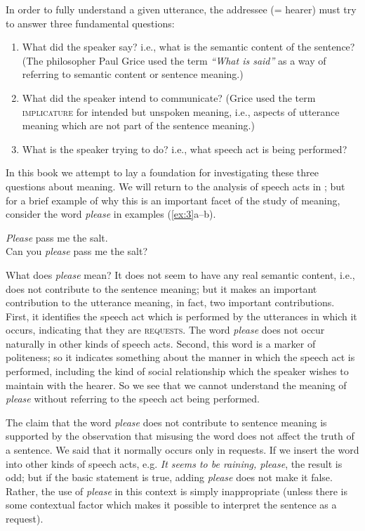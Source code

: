 In order to fully understand a given utterance, the addressee (= hearer) must try to answer three fundamental questions:


\begin{enumerate}
\item What did the speaker say? i.e., what is the semantic content of the sentence? (The philosopher Paul Grice used the term \textit{“What is said”} as a way of referring to semantic content or sentence meaning.)
\item What did the speaker intend to communicate? (Grice used the term \textsc{implicature} for intended but unspoken meaning, i.e., aspects of utterance meaning which are not part of the sentence meaning.)
\item What is the speaker trying to do? i.e., what speech act is being performed?
\end{enumerate}

In this book we attempt to lay a foundation for investigating these three questions about meaning. We will return to the analysis of speech acts in ; but for a brief example of why this is an important facet of the study of meaning, consider the word \textit{please} in examples (\ref{ex:3}a--b).


\ea \label{ex:3}
\ea \textit{Please} pass me the salt.\\
\ex Can you \textit{please} pass me the salt?
                       \z
\z


What does \textit{please} mean? It does not seem to have any real semantic content, i.e., does not contribute to the sentence meaning; but it makes an important contribution to the utterance meaning, in fact, two important contributions. First, it identifies the speech act which is performed by the utterances in which it occurs, indicating that they are \textsc{requests}. The word \textit{please} does not occur naturally in other kinds of speech acts. Second, this word is a marker of politeness; so it indicates something about the manner in which the speech act is performed, including the kind of social relationship which the speaker wishes to maintain with the hearer. So we see that we cannot understand the meaning of \textit{please} without referring to the speech act being performed.



The claim that the word \textit{please} does not contribute to sentence meaning is supported by the observation that misusing the word does not affect the truth of a sentence. We said that it normally occurs only in requests. If we insert the word into other kinds of speech acts, e.g. \textit{It seems to be raining, please}, the result is odd; but if the basic statement is true, adding \textit{please} does not make it false. Rather, the use of \textit{please} in this context is simply inappropriate (unless there is some contextual factor which makes it possible to interpret the sentence as a request).



